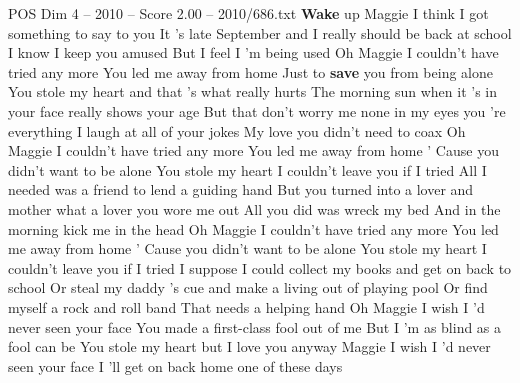 \begin{textsample}{POS Dim 4 – 2010 – Score 2.00 – 2010/686.txt}  \label{ex:f4_pos_035}
\textbf{Wake} up Maggie I think I got something to say to you It 's late September and I really should be back at school I know I keep you amused But I feel I 'm being used Oh Maggie I couldn't have tried any more You led me away from home Just to \textbf{save} you from being alone You stole my heart and that 's what really hurts The morning sun when it 's in your face really shows your age But that don't worry me none in my eyes you 're everything I laugh at all of your jokes My love you didn't need to coax Oh Maggie I couldn't have tried any more You led me away from home ' Cause you didn't want to be alone You stole my heart I couldn't leave you if I tried All I needed was a friend to lend a guiding hand But you turned into a lover and mother what a lover you wore me out All you did was wreck my bed And in the morning kick me in the head Oh Maggie I couldn't have tried any more You led me away from home ' Cause you didn't want to be alone You stole my heart I couldn't leave you if I tried I suppose I could collect my books and get on back to school Or steal my daddy 's cue and make a living out of playing pool Or find myself a rock and roll band That needs a helping hand Oh Maggie I wish I 'd never seen your face You made a first-class fool out of me But I 'm as blind as a fool can be You stole my heart but I love you anyway Maggie I wish I 'd never seen your face I 'll get on back home one of these days

\end{textsample}

